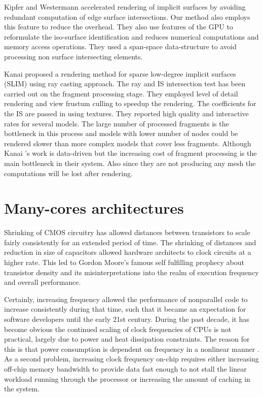Kipfer and Westermann \cite{Kipfer2005} accelerated rendering of implicit surfaces by avoiding redundant computation of edge surface intersections. 
Our method also employs this feature to reduce the overhead. They also use features of the GPU to reformulate the iso-surface identification and reduces 
numerical computations and memory access operations. They used a span-space data-structure to avoid processing non surface intersecting elements.

Kanai \etal \cite{Kanai2006a} proposed a rendering method for sparse low-degree implicit surfaces (SLIM) using ray casting approach. The ray and IS intersection
test has been carried out on the fragment processing stage. They employed level of detail rendering and view frustum culling to speedup the rendering. 
The coefficients for the IS are passed in using textures. They reported high quality and interactive rates for several models. The large number of processed
fragments is the bottleneck in this process and models with lower number of nodes could be rendered slower than more complex models that cover less fragments.
Although Kanai \etal's work is data-driven but the increasing cost of fragment processing is the main bottleneck in their system. Also since they are not
producing any mesh the computations will be lost after rendering.



\section{Many-cores architectures}
Shrinking of CMOS circuitry has allowed distances between transistors to scale fairly consistently for an extended period of time. The shrinking 
of distances and reduction in size of capacitors allowed hardware architects to clock circuits at a higher rate. This led to Gordon Moore's
famous self fulfilling prophecy about transistor density and its misinterpretations into the realm of execution frequency and overall performance.

Certainly, increasing frequency allowed the performance of nonparallel code to increase consistently during that time, such that it became an 
expectation for software developers until the early 21st century. During the past decade, it has become obvious the continued scaling of clock 
frequencies of CPUs is not practical, largely due to power and heat dissipation constraints. The reason for this is that power consumption is 
dependent on frequency in a nonlinear manner \cite{gaster2012heterogeneous}. As a second problem, increasing clock frequency on-chip requires 
either increasing off-chip memory bandwidth to provide data fast enough to not stall the linear workload running through the processor or increasing
the amount of caching in the system. 

